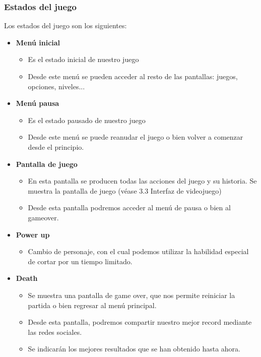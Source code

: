 \documentclass[palatino]{apuntes}
\begin{document}
\subsubsection{Estados del juego}
Los estados del juego son los siguientes:

\begin{itemize}
    \item \textbf{Menú inicial}
        \begin{itemize}
            \item Es el estado inicial de nuestro juego
            \item Desde este menú se pueden acceder al resto de las pantallas: juegos, opciones, niveles...
        \end{itemize}
    \item \textbf{Menú pausa}
        \begin{itemize}
            \item Es el estado pausado de nuestro juego
            \item Desde este menú se puede reanudar el juego o bien volver a comenzar desde el principio.
        \end{itemize}
    \item \textbf{Pantalla de juego}
        \begin{itemize}
            \item En esta pantalla se producen todas las acciones del juego y su historia. Se muestra la pantalla de juego (véase 3.3 Interfaz de videojuego)
        \item Desde esta pantalla podremos acceder al menú de pausa o bien al gameover.
        \end{itemize}

   \item \textbf{Power up}
        \begin{itemize}
            \item Cambio de personaje, con el cual podemos utilizar la habilidad especial de cortar por un tiempo limitado.
        \end{itemize}
    
    \item \textbf{Death}
        \begin{itemize}
            \item Se muestra una pantalla de game over, que nos permite reiniciar la partida o bien regresar al menú principal.
            \item Desde esta pantalla, podremos compartir nuestro mejor record mediante las redes sociales.
            \item Se indicarán los mejores resultados que se han obtenido hasta ahora.
        \end{itemize}
            
\end{itemize}
\end{document}
